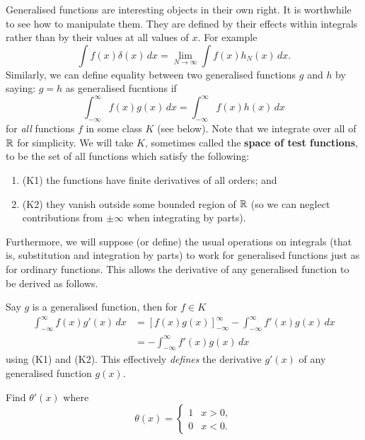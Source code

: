 Generalised functions are interesting objects in their own right.
It is worthwhile to see how to manipulate them.
They are defined by their effects within integrals
rather than by their values at all values of $x$. 
For example
\[
    \int f(x) \delta(x) \,dx = \lim_{N \to \infty} \int f(x) h_N(x) \,dx.
\]
Similarly, we can define equality between two generalised functions $g$ and $h$
by saying: $g = h$ as generalised fucntions if
\[
    \int_{-\infty}^\infty f(x) g(x) \,dx = \int_{-\infty}^\infty f(x) h(x) \,dx
\]
for \emph{all} functions $f$ in some class $K$ (see below).
Note that we integrate over all of $\mathbb{R}$ for simplicity.
We will take $K$, sometimes called the \textbf{space of test functions},
to be the set of all functions which satisfy the following:
\begin{enumerate}
    \item 
        (K1) the functions have finite derivatives of all orders; and

    \item 
        (K2) they vanish outside some bounded region of $\mathbb{R}$ 
        (so we can neglect contributions from $\pm \infty$ when
        integrating by parts).
\end{enumerate}
Furthermore, we will suppose (or define) the usual operations on integrals
(that is, substitution and integration by parts)
to work for generalised functions just as for ordinary functions.
This allows the derivative of any generalised function to be derived as follows.

Say $g$ is a generalised function, then for $f \in K$
\begin{align*}
    \int_{-\infty}^{\infty} f(x) g'(x) \,dx
    &=
    \left[
        f(x) g(x)
    \right]_{-\infty}^{\infty}
    - \int_{-\infty}^{\infty} f'(x) g(x) \,dx \\
    &= -\int_{-\infty}^{\infty} f'(x) g(x) \,dx
\end{align*}
using (K1) and (K2).
This effectively \emph{defines} the derivative $g'(x)$ of any generalised function $g(x)$.

\begin{example}
    Find $\theta'(x)$ where
    \[
        \theta(x) =
        \begin{cases}
            1 & x > 0, \\
            0 & x < 0.
        \end{cases}
    \]
\end{example}

